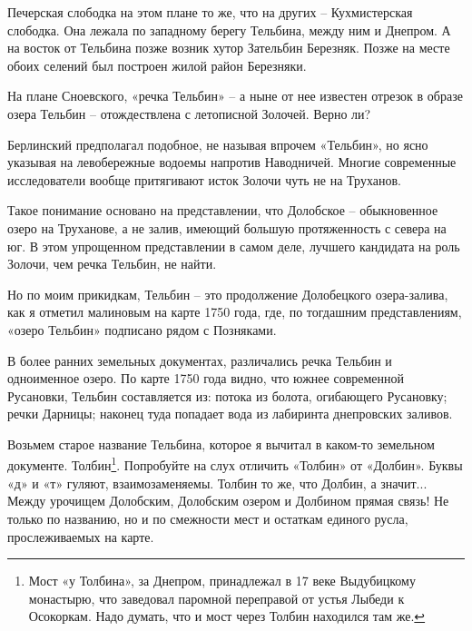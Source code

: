 Печерская слободка на этом плане то же, что на других – Кухмистерская слободка. Она лежала по западному берегу Тельбина, между ним и Днепром. А на восток от Тельбина позже возник хутор Зательбин Березняк. Позже на месте обоих селений был построен жилой район Березняки.




На плане Сноевского, «речка Тельбин» – а ныне от нее известен отрезок в образе озера Тельбин – отождествлена с летописной Золочей. Верно ли?

Берлинский предполагал подобное, не называя впрочем «Тельбин», но ясно указывая на левобережные водоемы напротив Наводничей. Многие современные исследователи вообще притягивают исток Золочи чуть не на Труханов.

Такое понимание основано на представлении, что Долобское – обыкновенное озеро на Труханове, а не залив, имеющий большую протяженность с севера на юг. В этом упрощенном представлении в самом деле, лучшего кандидата на роль Золочи, чем речка Тельбин, не найти.

Но по моим прикидкам, Тельбин – это продолжение Долобецкого озера-залива, как я отметил малиновым на карте 1750 года, где, по тогдашним представлениям, «озеро Тельбин» подписано рядом с Позняками.

В более ранних земельных документах, различались речка Тельбин и одноименное озеро. По карте 1750 года видно, что южнее современной Русановки, Тельбин составляется из: потока из болота, огибающего Русановку; речки Дарницы; наконец туда попадает вода из лабиринта днепровских заливов.

Возьмем старое название Тельбина, которое я вычитал в каком-то земельном документе. Толбин\footnote{Мост «у Толбина», за Днепром, принадлежал в 17 веке Выдубицкому монастырю, что заведовал паромной переправой от устья Лыбеди к Осокоркам. Надо думать, что и мост через Толбин находился там же.}. Попробуйте на слух отличить «Толбин» от «Долбин». Буквы «д» и «т» гуляют, взаимозаменяемы. Толбин то же, что Долбин, а значит... Между урочищем Долобским, Долобским озером и Долбином прямая связь! Не только по названию, но и по смежности мест и остаткам единого русла, прослеживаемых на карте.

